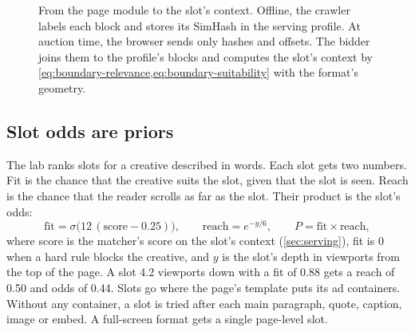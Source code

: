 \begin{figure}[t]
\caption{From the page module to the slot's context. Offline, the crawler labels
  each block and stores its SimHash in the serving profile. At auction time,
  the browser sends only hashes and offsets. The bidder joins them to the
  profile's blocks and computes the slot's context by
  \cref{eq:boundary-relevance,eq:boundary-suitability} with the format's
  geometry.}
\label{fig:boundary-flow}
\end{figure}

\subsection{Slot odds are priors}\label{sec:boundary-odds}

The lab ranks slots for a creative described in words. Each slot gets two
numbers. Fit is the chance that the creative suits the slot, given that the
slot is seen. Reach is the chance that the reader scrolls as far as the slot.
Their product is the slot's odds:
\begin{equation}\label{eq:boundary-odds}
\text{fit} = \sigma\bigl(12\,(\text{score} - 0.25)\bigr),\qquad
\text{reach} = e^{-y/6},\qquad
P = \text{fit} \times \text{reach},
\end{equation}
where score is the matcher's score on the slot's context (\cref{sec:serving}),
fit is $0$ when a hard rule blocks the creative, and $y$ is the slot's depth
in viewports from the top of the page. A slot 4.2 viewports down with a fit of
0.88 gets a reach of 0.50 and odds of 0.44. Slots go where the page's
template puts its ad containers. Without any container, a slot is tried after
each main paragraph, quote, caption, image or embed. A full-screen format gets
a single page-level slot.

